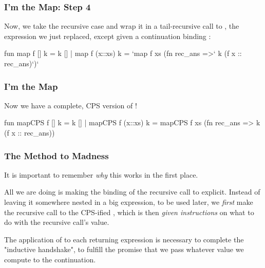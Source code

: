 \documentclass[aspectratio=169, handout]{beamer}
\begin{document}
\begin{frame}[fragile]
  \frametitle{I'm the Map: Step 4}

  Now, we take the recursive case and wrap it in a tail-recursive call to
  , the expression we just replaced, except given a continuation binding 
  :

  \begin{codeblock}
    fun map f [] k      = k []
      | map f (x::xs) k = 
          `map f xs (fn rec_ans =>` k (f x :: rec_ans)`)`
  \end{codeblock}
\end{frame}

\begin{frame}[fragile]
  \frametitle{I'm the Map}

  Now we have a complete, CPS version of !

  \begin{codeblock}
    fun mapCPS f [] k      = k []
      | mapCPS f (x::xs) k = 
          mapCPS f xs (fn rec_ans => k (f x :: rec_ans))
  \end{codeblock}
\end{frame}

\begin{frame}[fragile]
  \frametitle{The Method to Madness}

  It is important to remember \textit{why} this works in the first place.

  \pause
  \vspace{\fill}

  All we are doing is making the binding of the recursive call to 
   explicit. Instead of leaving it somewhere nested in a big 
  expression, to be used later, we \textit{first} make the recursive call to
  the CPS-ified , which is then \textit{given instructions}
  on what to do with the recursive call's value.

  \pause
  \vspace{\fill}

  The application of  to each returning expression is necessary to
  complete the "inductive handshake", to fulfill the promise that we 
  pass whatever value we compute to the continuation.
\end{frame}

\begin{comment}
  To demonstrate the difference between CPS and direct-style,
  call for a student volunteer.

  I will ask the student to walk across the room and get a 
  "FUNCTIONS ARE POINTERS" sticker. When they return with
  it, I will rip it up.

  I will then ask them to do it again.

  The key distinction is that, I need to remember to rip
  it up when they come back! This is annoying to me, because
  it takes up space in my brain, and generally inconveniences
  me. It would be better if I just told the student to rip it up
  themselves, and then come back with the pieces.
\end{comment}
\end{document}

